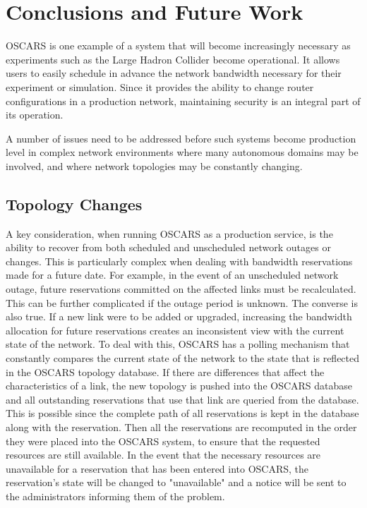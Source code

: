 \documentclass[conference]{IEEEtran}
\begin{document}
\section{Conclusions and Future Work}

OSCARS is one example of a system that will become increasingly necessary
as experiments such as the Large Hadron Collider become operational.  It
allows users to easily schedule in advance the 
network bandwidth necessary for their experiment or simulation.  Since it
provides the ability to change router configurations in a production network,
maintaining security is an integral part of its operation.

A number of issues need to be addressed before such systems become
production level in complex network environments where many autonomous
domains may be involved, and where network topologies may be constantly
changing.

\subsection{Topology Changes}

A key consideration, when running OSCARS as a production service, is the ability
to recover from both scheduled and unscheduled network outages or changes.  This
is particularly complex when dealing with bandwidth reservations made for a
future date.  For example, in the event of an unscheduled network outage, future
reservations committed on the affected links must be recalculated. This can be
further complicated if the outage period is unknown.  The converse is also true.
If a new link were to be added or upgraded, increasing the bandwidth allocation
for future reservations creates an inconsistent view with the current state of
the network.  To deal with this, OSCARS
has a polling mechanism that constantly
compares the current state of the network to the state that is reflected in the
OSCARS topology database. If there are differences that affect the
characteristics of a link, the new topology is pushed into the OSCARS database
and all outstanding reservations that use that link are queried from the
database. This is possible since the complete path of all reservations is kept
in the database along with the reservation. Then all the reservations are
recomputed in the order they were placed into the OSCARS system, to ensure that
the requested resources are still available.  In the event that the necessary
resources are unavailable for a reservation that has been entered into OSCARS,
the reservation's state will be changed to "unavailable" and a notice will be
sent to the administrators informing them of the problem.
\end{document}

